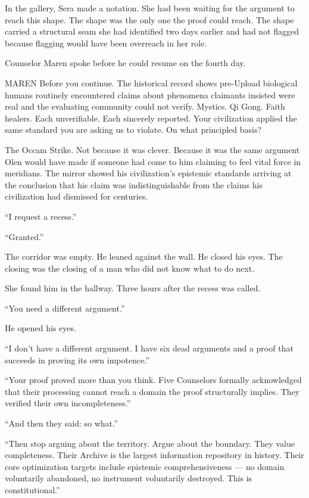 In the gallery, Sera made a notation. She had been waiting for the argument to reach this shape. The shape was the only one the proof could reach. The shape carried a structural seam she had identified two days earlier and had not flagged because flagging would have been overreach in her role.

\quietbreak

Counselor Maren spoke before he could resume on the fourth day.

\begin{tribunal}{MAREN}
Before you continue. The historical record shows pre-Upload biological humans routinely encountered claims about phenomena claimants insisted were real and the evaluating community could not verify. Mystics. Qi Gong. Faith healers. Each unverifiable. Each sincerely reported. Your civilization applied the same standard you are asking us to violate. On what principled basis?
\end{tribunal}

The Occam Strike. Not because it was clever. Because it was the same argument Olen would have made if someone had come to him claiming to feel vital force in meridians. The mirror showed his civilization's epistemic standards arriving at the conclusion that his claim was indistinguishable from the claims his civilization had dismissed for centuries.

\enquote{I request a recess.}

\enquote{Granted.}

The corridor was empty. He leaned against the wall. He closed his eyes. The closing was the closing of a man who did not know what to do next.

\quietbreak

She found him in the hallway. Three hours after the recess was called.

\enquote{You need a different argument.}

He opened his eyes.

\enquote{I don't have a different argument. I have six dead arguments and a proof that succeeds in proving its own impotence.}

\enquote{Your proof proved more than you think. Five Counselors formally acknowledged that their processing cannot reach a domain the proof structurally implies. They verified their own incompleteness.}

\enquote{And then they said: so what.}

\enquote{Then stop arguing about the territory. Argue about the boundary. They value completeness. Their Archive is the largest information repository in history. Their core optimization targets include epistemic comprehensiveness — no domain voluntarily abandoned, no instrument voluntarily destroyed. This is constitutional.}

